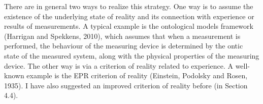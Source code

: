 There are in general two ways to realize this strategy.
One way is to assume the existence of the underlying state of  reality and its connection with experience or results of measurements. A typical example is the ontological models framework (Harrigan and Spekkens, 2010), which assumes that when a measurement is performed, the behaviour of the measuring device is determined by the ontic state of the measured system, along with the physical properties of the measuring device.
The other way is via a criterion of reality related to experience. A well-known example is the EPR criterion of reality (Einstein, Podolsky and Rosen, 1935). I have also suggested an improved criterion of reality before (in Section 4.4). 

